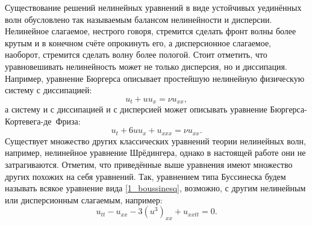 \documentclass[12pt, a4paper]{report}
\begin{document}
Существование решений нелинейных уравнений в виде устойчивых уединённых волн обусловлено так называемым балансом нелинейности и дисперсии. Нелинейное слагаемое, нестрого говоря, стремится сделать фронт волны более крутым и в конечном счёте опрокинуть его, а дисперсионное слагаемое, наоборот, стремится сделать волну более пологой. Стоит отметить, что уравновешивать нелинейность может не только дисперсия, но и диссипация. Например, уравнение Бюргерса описывает простейшую нелинейную физическую систему с диссипацией:
\begin{equation}\label{1_burgers}
u_{t} + u u_x = \nu u_{xx},
\end{equation}
а систему и с диссипацией и с дисперсией может описывать уравнение Бюргерса-Кортевега-де~Фриза:
\begin{equation}\label{1_burgers-kdv}
u_{t} + 6u u_x + u_{xxx} = \nu u_{xx}.
\end{equation}
Существует множество других классических уравнений теории нелинейных волн, например, нелинейное уравнение Шрёдингера, однако в настоящей работе они не затрагиваются. Отметим, что приведённые выше уравнения имеют множество других похожих на себя уравнений. Так, уравнением типа Буссинеска будем называть всякое уравнение вида \eqref{1_boussinesq}, возможно, с другим нелинейным или дисперсионным слагаемым, например:
$$
u_{tt} - u_{xx} - 3 (u^3)_{xx} + u_{xxtt} = 0.
$$
\end{document}
